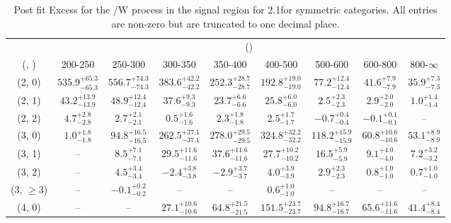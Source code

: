 \begin{table}[h!]
\tiny
\centering
\caption{Post fit Excess for the \ttbar/W process in the signal region for 2.1\ifb for symmetric categories. All entries are non-zero but are truncated to one decimal place.\label{tab:excessseppost_sig_ttw_sym}}
\begin{tabular}
{ccccccccc}
	\hline\hline
	& \multicolumn{8}{c}{\scalht (\gev)} \\ 
	 (\njet,  \nb) & 200-250 & 250-300 & 300-350 & 350-400 & 400-500 & 500-600 & 600-800 & 800-$\infty$ \\ [0.8ex] 
\hline
	(2, 0) & $535.9^{+ 65.3 }_{- 65.3 }$ & $556.7^{+ 74.3 }_{- 74.3 }$ & $383.6^{+ 42.2 }_{- 42.2 }$ & $252.3^{+ 28.7 }_{- 28.7 }$ & $192.8^{+ 19.0 }_{- 19.0 }$ & $77.2^{+ 12.4 }_{- 12.4 }$ & $41.6^{+ 7.9 }_{- 7.9 }$ & $35.9^{+ 7.3 }_{- 7.3 }$ \\[0.5ex] 
	(2, 1) & $43.2^{+ 13.9 }_{- 13.9 }$ & $48.9^{+ 12.4 }_{- 12.4 }$ & $37.6^{+ 9.3 }_{- 9.3 }$ & $23.7^{+ 6.6 }_{- 6.6 }$ & $25.8^{+ 6.0 }_{- 6.0 }$ & $2.5^{+ 2.3 }_{- 2.3 }$ & $2.9^{+ 2.0 }_{- 2.0 }$ & $1.0^{+ 1.4 }_{- 1.4 }$ \\[0.5ex] 
	(2, 2) & $4.7^{+ 2.8 }_{- 2.8 }$ & $2.7^{+ 2.1 }_{- 2.1 }$ & $0.5^{+ 1.6 }_{- 1.6 }$ & $2.3^{+ 1.8 }_{- 1.8 }$ & $2.5^{+ 1.7 }_{- 1.7 }$ & $-0.7^{+ 0.4 }_{- 0.4 }$ & $-0.1^{+ 0.1 }_{- 0.1 }$ & -- \\[0.5ex] 
	(3, 0) & $1.0^{+ 1.8 }_{- 1.8 }$ & $94.8^{+ 16.5 }_{- 16.5 }$ & $262.5^{+ 37.1 }_{- 37.1 }$ & $278.0^{+ 29.5 }_{- 29.5 }$ & $324.8^{+ 32.2 }_{- 32.2 }$ & $118.2^{+ 15.9 }_{- 15.9 }$ & $60.8^{+ 10.6 }_{- 10.6 }$ & $53.1^{+ 8.9 }_{- 8.9 }$ \\[0.5ex] 
	(3, 1) & -- & $8.5^{+ 7.1 }_{- 7.1 }$ & $29.5^{+ 11.6 }_{- 11.6 }$ & $37.6^{+ 11.6 }_{- 11.6 }$ & $27.7^{+ 10.2 }_{- 10.2 }$ & $16.5^{+ 5.9 }_{- 5.9 }$ & $9.1^{+ 4.0 }_{- 4.0 }$ & $7.2^{+ 3.2 }_{- 3.2 }$ \\[0.5ex] 
	(3, 2) & -- & $4.5^{+ 3.4 }_{- 3.4 }$ & $-2.4^{+ 3.8 }_{- 3.8 }$ & $-2.9^{+ 3.7 }_{- 3.7 }$ & $4.0^{+ 3.9 }_{- 3.9 }$ & $2.9^{+ 2.3 }_{- 2.3 }$ & $0.8^{+ 1.0 }_{- 1.0 }$ & $0.7^{+ 1.0 }_{- 1.0 }$ \\[0.5ex] 
	(3, $\ge3$) & -- & $-0.1^{+ 0.2 }_{- 0.2 }$ & -- & -- & $0.6^{+ 1.0 }_{- 1.0 }$ & -- & -- & -- \\[0.5ex] 
	(4, 0) & -- & -- & $27.1^{+ 10.6 }_{- 10.6 }$ & $64.8^{+ 21.5 }_{- 21.5 }$ & $151.5^{+ 23.7 }_{- 23.7 }$ & $94.8^{+ 16.7 }_{- 16.7 }$ & $65.6^{+ 11.6 }_{- 11.6 }$ & $41.4^{+ 8.4 }_{- 8.4 }$ \\[0.5ex] 

\end{tabular}
\end{table}
